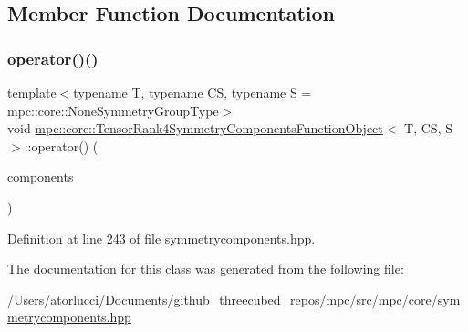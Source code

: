 \subsection{Member Function Documentation}
\mbox{\label{structmpc_1_1core_1_1_tensor_rank4_symmetry_components_function_object_aec8a15001e34d9d89ef5b9097a0524ee}} 
\subsubsection{\texorpdfstring{operator()()}{operator()()}}
{\footnotesize\ttfamily template$<$typename T, typename CS, typename S = mpc\+::core\+::\+None\+Symmetry\+Group\+Type$>$ \\
void \mbox{\hyperlink{structmpc_1_1core_1_1_tensor_rank4_symmetry_components_function_object}{mpc\+::core\+::\+Tensor\+Rank4\+Symmetry\+Components\+Function\+Object}}$<$ T, CS, S $>$\+::operator() (\begin{DoxyParamCaption}\item[{std\+::set$<$ \mbox{\hyperlink{classmpc_1_1core_1_1_tensor_rank_n_component}{mpc\+::core\+::\+Tensor\+Rank\+N\+Component}}$<$ T, 4 $>$ $>$ \&}]{components }\end{DoxyParamCaption})\hspace{0.3cm}{\ttfamily [inline]}}



Definition at line 243 of file symmetrycomponents.\+hpp.



The documentation for this class was generated from the following file\+:\begin{DoxyCompactItemize}
\item 
/\+Users/atorlucci/\+Documents/github\+\_\+threecubed\+\_\+repos/mpc/src/mpc/core/\mbox{\hyperlink{symmetrycomponents_8hpp}{symmetrycomponents.\+hpp}}\end{DoxyCompactItemize}
